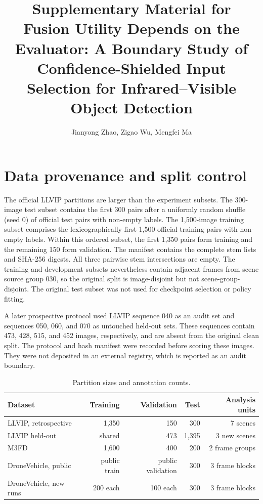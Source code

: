 \documentclass[11pt]{article}
\title{Supplementary Material for\\Fusion Utility Depends on the Evaluator:
A Boundary Study of Confidence-Shielded Input Selection for Infrared--Visible Object Detection}
\author{Jianyong Zhao, Zigao Wu, Mengfei Ma}
\date{}
\begin{document}
\maketitle
\sloppy
\renewcommand{\thefigure}{S\arabic{figure}}

\section{Data provenance and split control}

The official LLVIP partitions are larger than the experiment subsets. The
300-image test subset contains the first 300 pairs after a uniformly random
shuffle (seed 0) of official test pairs with non-empty labels. The
1,500-image training subset comprises the lexicographically first 1,500
official training pairs with non-empty labels. Within this ordered subset, the
first 1,350 pairs form training and the remaining 150 form validation. The
manifest contains the complete stem lists and SHA-256 digests. All three
pairwise stem intersections are empty. The training and development subsets
nevertheless contain adjacent frames from scene source group 030, so the
original split is image-disjoint but not scene-group-disjoint. The original
test subset was not used for checkpoint selection or policy fitting.

A later prospective protocol used LLVIP sequence 040 as an audit set and
sequences 050, 060, and 070 as untouched held-out sets. These sequences
contain 473, 428, 515, and 452 images, respectively, and are absent from the
original clean split. The protocol and hash manifest were recorded before
scoring these images. They were not deposited in an external registry, which
is reported as an audit boundary.

\begin{table}[h]
\centering
\small
\caption{Partition sizes and annotation counts.}
\begin{tabular}{@{}lrrrr@{}}
\toprule
Dataset & Training & Validation & Test & Analysis units \\
\midrule
LLVIP, retrospective & 1,350 & 150 & 300 & 7 scenes \\
LLVIP held-out & shared & 473 & 1,395 & 3 new scenes \\
M3FD & 1,600 & 400 & 200 & 2 frame groups \\
DroneVehicle, public & public train & public validation & 300 & 3 frame blocks \\
DroneVehicle, new runs & 200 each & 100 each & 300 & 3 frame blocks \\
\bottomrule
\end{tabular}
\end{table}
\end{document}
